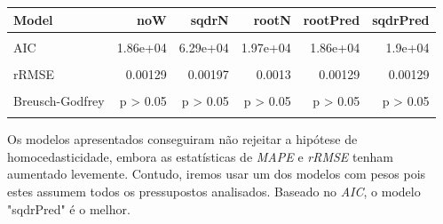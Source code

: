 \documentclass[justified, 11pt]{scrartcl}\usepackage[]{graphicx}\usepackage[]{xcolor}
\newenvironment{knitrout}{}{} %
\begin{document}
\begin{knitrout}
\begin{table}
\begin{tabular}{l|r|r|r|r|r}
\hline
Model & noW & sqdrN & rootN & rootPred & sqdrPred\\
\hline
\cellcolor{gray!6}{R2} & \cellcolor{gray!6}{0.417} & \cellcolor{gray!6}{0.887} & \cellcolor{gray!6}{0.369} & \cellcolor{gray!6}{0.424} & \cellcolor{gray!6}{0.443}\\
\hline
AIC & 1.86e+04 & 6.29e+04 & 1.97e+04 & 1.86e+04 & 1.9e+04\\
\hline
\cellcolor{gray!6}{MAPE} & \cellcolor{gray!6}{0.0836} & \cellcolor{gray!6}{0.153} & \cellcolor{gray!6}{0.0859} & \cellcolor{gray!6}{0.0836} & \cellcolor{gray!6}{0.084}\\
\hline
rRMSE & 0.00129 & 0.00197 & 0.0013 & 0.00129 & 0.00129\\
\hline
\cellcolor{gray!6}{Breusch-Pagan} & \cellcolor{gray!6}{p = 1.32e-103} & \cellcolor{gray!6}{p > 0.05} & \cellcolor{gray!6}{p > 0.05} & \cellcolor{gray!6}{p = 1.41e-53} & \cellcolor{gray!6}{p > 0.05}\\
\hline
Breusch-Godfrey & p > 0.05 & p > 0.05 & p > 0.05 & p > 0.05 & p > 0.05\\
\hline
\cellcolor{gray!6}{Jarque-Bera} & \cellcolor{gray!6}{p < 0.05} & \cellcolor{gray!6}{p < 0.05} & \cellcolor{gray!6}{p < 0.05} & \cellcolor{gray!6}{p < 0.05} & \cellcolor{gray!6}{p < 0.05}\\
\hline
\end{tabular}
\endgroup{}
\end{table}

\end{knitrout}

Os modelos apresentados conseguiram não rejeitar a hipótese de homocedasticidade, embora as estatísticas de \textit{MAPE} e \textit{rRMSE} tenham aumentado levemente. Contudo, iremos usar um dos modelos com pesos pois estes assumem todos os pressupostos analisados. Baseado no \textit{AIC}, o modelo "sqdrPred" é o melhor.\\
\end{document}
